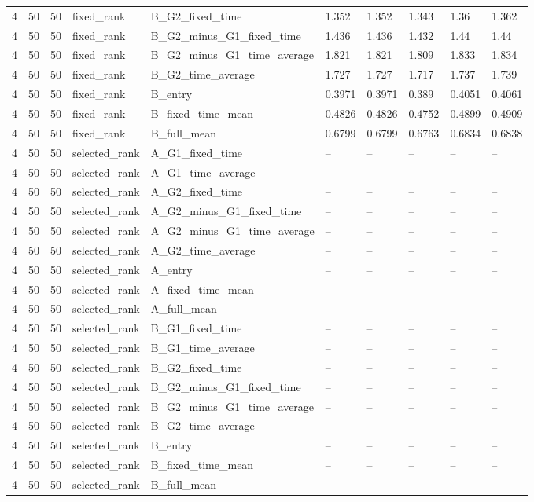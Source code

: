 \begin{longtable}{llllllllll}
4 & 50 & 50 & fixed\_rank & B\_G2\_fixed\_time & 1.352 & 1.352 & 1.343 & 1.36 & 1.362 \\
4 & 50 & 50 & fixed\_rank & B\_G2\_minus\_G1\_fixed\_time & 1.436 & 1.436 & 1.432 & 1.44 & 1.44 \\
4 & 50 & 50 & fixed\_rank & B\_G2\_minus\_G1\_time\_average & 1.821 & 1.821 & 1.809 & 1.833 & 1.834 \\
4 & 50 & 50 & fixed\_rank & B\_G2\_time\_average & 1.727 & 1.727 & 1.717 & 1.737 & 1.739 \\
4 & 50 & 50 & fixed\_rank & B\_entry & 0.3971 & 0.3971 & 0.389 & 0.4051 & 0.4061 \\
4 & 50 & 50 & fixed\_rank & B\_fixed\_time\_mean & 0.4826 & 0.4826 & 0.4752 & 0.4899 & 0.4909 \\
4 & 50 & 50 & fixed\_rank & B\_full\_mean & 0.6799 & 0.6799 & 0.6763 & 0.6834 & 0.6838 \\
4 & 50 & 50 & selected\_rank & A\_G1\_fixed\_time & -- & -- & -- & -- & -- \\
4 & 50 & 50 & selected\_rank & A\_G1\_time\_average & -- & -- & -- & -- & -- \\
4 & 50 & 50 & selected\_rank & A\_G2\_fixed\_time & -- & -- & -- & -- & -- \\
4 & 50 & 50 & selected\_rank & A\_G2\_minus\_G1\_fixed\_time & -- & -- & -- & -- & -- \\
4 & 50 & 50 & selected\_rank & A\_G2\_minus\_G1\_time\_average & -- & -- & -- & -- & -- \\
4 & 50 & 50 & selected\_rank & A\_G2\_time\_average & -- & -- & -- & -- & -- \\
4 & 50 & 50 & selected\_rank & A\_entry & -- & -- & -- & -- & -- \\
4 & 50 & 50 & selected\_rank & A\_fixed\_time\_mean & -- & -- & -- & -- & -- \\
4 & 50 & 50 & selected\_rank & A\_full\_mean & -- & -- & -- & -- & -- \\
4 & 50 & 50 & selected\_rank & B\_G1\_fixed\_time & -- & -- & -- & -- & -- \\
4 & 50 & 50 & selected\_rank & B\_G1\_time\_average & -- & -- & -- & -- & -- \\
4 & 50 & 50 & selected\_rank & B\_G2\_fixed\_time & -- & -- & -- & -- & -- \\
4 & 50 & 50 & selected\_rank & B\_G2\_minus\_G1\_fixed\_time & -- & -- & -- & -- & -- \\
4 & 50 & 50 & selected\_rank & B\_G2\_minus\_G1\_time\_average & -- & -- & -- & -- & -- \\
4 & 50 & 50 & selected\_rank & B\_G2\_time\_average & -- & -- & -- & -- & -- \\
4 & 50 & 50 & selected\_rank & B\_entry & -- & -- & -- & -- & -- \\
4 & 50 & 50 & selected\_rank & B\_fixed\_time\_mean & -- & -- & -- & -- & -- \\
4 & 50 & 50 & selected\_rank & B\_full\_mean & -- & -- & -- & -- & -- \\
\bottomrule
\end{longtable}
\endgroup
